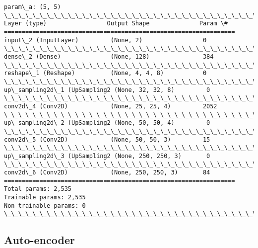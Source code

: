 \documentclass[11pt]{article}
\begin{document}
    \begin{Verbatim}[commandchars=\\\{\}]
param\_a: (5, 5)
\_\_\_\_\_\_\_\_\_\_\_\_\_\_\_\_\_\_\_\_\_\_\_\_\_\_\_\_\_\_\_\_\_\_\_\_\_\_\_\_\_\_\_\_\_\_\_\_\_\_\_\_\_\_\_\_\_\_\_\_\_\_\_\_\_
Layer (type)                 Output Shape              Param \#   
=================================================================
input\_2 (InputLayer)         (None, 2)                 0         
\_\_\_\_\_\_\_\_\_\_\_\_\_\_\_\_\_\_\_\_\_\_\_\_\_\_\_\_\_\_\_\_\_\_\_\_\_\_\_\_\_\_\_\_\_\_\_\_\_\_\_\_\_\_\_\_\_\_\_\_\_\_\_\_\_
dense\_2 (Dense)              (None, 128)               384       
\_\_\_\_\_\_\_\_\_\_\_\_\_\_\_\_\_\_\_\_\_\_\_\_\_\_\_\_\_\_\_\_\_\_\_\_\_\_\_\_\_\_\_\_\_\_\_\_\_\_\_\_\_\_\_\_\_\_\_\_\_\_\_\_\_
reshape\_1 (Reshape)          (None, 4, 4, 8)           0         
\_\_\_\_\_\_\_\_\_\_\_\_\_\_\_\_\_\_\_\_\_\_\_\_\_\_\_\_\_\_\_\_\_\_\_\_\_\_\_\_\_\_\_\_\_\_\_\_\_\_\_\_\_\_\_\_\_\_\_\_\_\_\_\_\_
up\_sampling2d\_1 (UpSampling2 (None, 32, 32, 8)         0         
\_\_\_\_\_\_\_\_\_\_\_\_\_\_\_\_\_\_\_\_\_\_\_\_\_\_\_\_\_\_\_\_\_\_\_\_\_\_\_\_\_\_\_\_\_\_\_\_\_\_\_\_\_\_\_\_\_\_\_\_\_\_\_\_\_
conv2d\_4 (Conv2D)            (None, 25, 25, 4)         2052      
\_\_\_\_\_\_\_\_\_\_\_\_\_\_\_\_\_\_\_\_\_\_\_\_\_\_\_\_\_\_\_\_\_\_\_\_\_\_\_\_\_\_\_\_\_\_\_\_\_\_\_\_\_\_\_\_\_\_\_\_\_\_\_\_\_
up\_sampling2d\_2 (UpSampling2 (None, 50, 50, 4)         0         
\_\_\_\_\_\_\_\_\_\_\_\_\_\_\_\_\_\_\_\_\_\_\_\_\_\_\_\_\_\_\_\_\_\_\_\_\_\_\_\_\_\_\_\_\_\_\_\_\_\_\_\_\_\_\_\_\_\_\_\_\_\_\_\_\_
conv2d\_5 (Conv2D)            (None, 50, 50, 3)         15        
\_\_\_\_\_\_\_\_\_\_\_\_\_\_\_\_\_\_\_\_\_\_\_\_\_\_\_\_\_\_\_\_\_\_\_\_\_\_\_\_\_\_\_\_\_\_\_\_\_\_\_\_\_\_\_\_\_\_\_\_\_\_\_\_\_
up\_sampling2d\_3 (UpSampling2 (None, 250, 250, 3)       0         
\_\_\_\_\_\_\_\_\_\_\_\_\_\_\_\_\_\_\_\_\_\_\_\_\_\_\_\_\_\_\_\_\_\_\_\_\_\_\_\_\_\_\_\_\_\_\_\_\_\_\_\_\_\_\_\_\_\_\_\_\_\_\_\_\_
conv2d\_6 (Conv2D)            (None, 250, 250, 3)       84        
=================================================================
Total params: 2,535
Trainable params: 2,535
Non-trainable params: 0
\_\_\_\_\_\_\_\_\_\_\_\_\_\_\_\_\_\_\_\_\_\_\_\_\_\_\_\_\_\_\_\_\_\_\_\_\_\_\_\_\_\_\_\_\_\_\_\_\_\_\_\_\_\_\_\_\_\_\_\_\_\_\_\_\_

    \end{Verbatim}

    \hypertarget{auto-encoder}{%
\subsection{Auto-encoder}\label{auto-encoder}}
\end{document}
